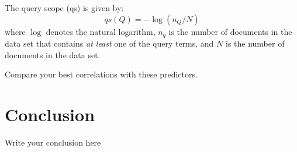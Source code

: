 \documentclass{sig-alternate}
\begin{document}
The query scope \cite{he2004inferring} (qs) is given by:
\begin{equation}
qs(Q) = -\log(n_Q/N)
\end{equation}
where $\log$ denotes the natural logarithm, $n_q$ is the number of documents in the data set that contains \emph{at least} one of the query terms, and $N$ is the number of documents in the data set.

Compare your best correlations with these predictors.
\section{Conclusion}
Write your conclusion here

%
\end{document}
